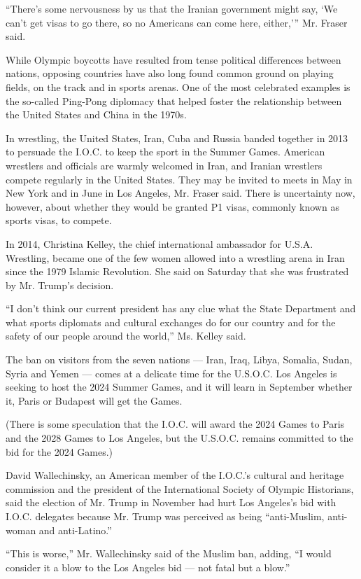 ``There's some nervousness by us that the Iranian government might say,
`We can't get visas to go there, so no Americans can come here,
either,''' Mr. Fraser said.

While Olympic boycotts have resulted from tense political differences
between nations, opposing countries have also long found common ground
on playing fields, on the track and in sports arenas. One of the most
celebrated examples is the so-called Ping-Pong diplomacy that helped
foster the relationship between the United States and China in the
1970s.

In wrestling, the United States, Iran, Cuba and Russia banded together
in 2013 to persuade the I.O.C. to keep the sport in the Summer Games.
American wrestlers and officials are warmly welcomed in Iran, and
Iranian wrestlers compete regularly in the United States. They may be
invited to meets in May in New York and in June in Los Angeles, Mr.
Fraser said. There is uncertainty now, however, about whether they would
be granted P1 visas, commonly known as sports visas, to compete.

In 2014, Christina Kelley, the chief international ambassador for U.S.A.
Wrestling, became one of the few women allowed into a wrestling arena in
Iran since the 1979 Islamic Revolution. She said on Saturday that she
was frustrated by Mr. Trump's decision.

``I don't think our current president has any clue what the State
Department and what sports diplomats and cultural exchanges do for our
country and for the safety of our people around the world,'' Ms. Kelley
said.

The ban on visitors from the seven nations --- Iran, Iraq, Libya,
Somalia, Sudan, Syria and Yemen --- comes at a delicate time for the
U.S.O.C. Los Angeles is seeking to host the 2024 Summer Games, and it
will learn in September whether it, Paris or Budapest will get the
Games.

(There is some speculation that the I.O.C. will award the 2024 Games to
Paris and the 2028 Games to Los Angeles, but the U.S.O.C. remains
committed to the bid for the 2024 Games.)

David Wallechinsky, an American member of the I.O.C.'s cultural and
heritage commission and the president of the International Society of
Olympic Historians, said the election of Mr. Trump in November had hurt
Los Angeles's bid with I.O.C. delegates because Mr. Trump was perceived
as being ``anti-Muslim, anti-woman and anti-Latino.''

``This is worse,'' Mr. Wallechinsky said of the Muslim ban, adding, ``I
would consider it a blow to the Los Angeles bid --- not fatal but a
blow.''

